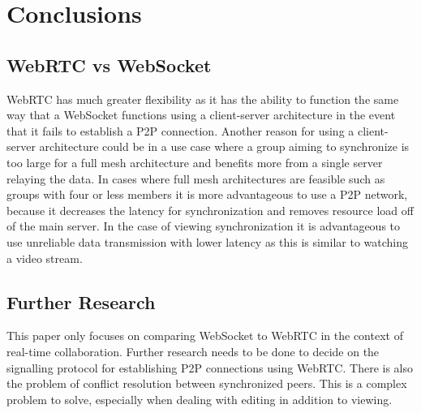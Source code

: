 \documentclass[prodmode,acmtecs]{acmsmall}
\begin{document}
\section{Conclusions}

\subsection{WebRTC vs WebSocket}
WebRTC has much greater flexibility as it has the ability to function the same way that a WebSocket functions using a client-server architecture in the event that it fails to establish a P2P connection. Another reason for using a client-server architecture could be in a use case where a group aiming to synchronize is too large for a full mesh architecture and benefits more from a single server relaying the data. In cases where full mesh architectures are feasible such as groups with four or less members it is more advantageous to use a P2P network, because it decreases the latency for synchronization and removes resource load off of the main server. In the case of viewing synchronization it is advantageous to use unreliable data transmission with lower latency as this is similar to watching a video stream. 

\subsection{Further Research}
This paper only focuses on comparing WebSocket to WebRTC in the context of real-time collaboration. Further research needs to be done to decide on the signalling protocol for establishing P2P connections using WebRTC. There is also the problem of conflict resolution between synchronized peers. This is a complex problem to solve, especially when dealing with editing in addition to viewing.




\appendix


\end{document}
